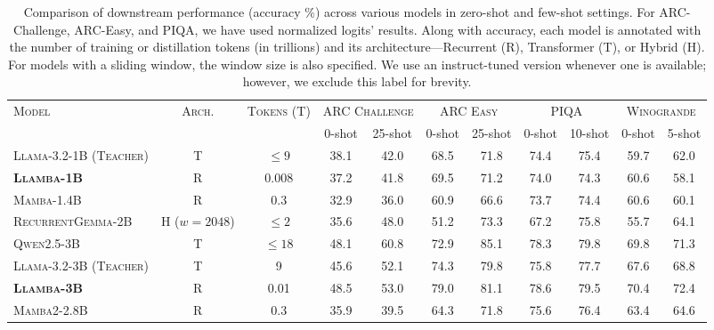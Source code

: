 \begin{table}[H]
    \small
    \centering
    \setlength{\tabcolsep}{3.2pt}
    \caption{
    Comparison of downstream performance (accuracy \%) across various models in zero-shot and few-shot settings.
    For ARC-Challenge, ARC-Easy, and PIQA, we have used normalized logits' results.
    Along with accuracy, each model is annotated with the number of training or distillation tokens (in trillions) and its architecture—Recurrent (R), Transformer (T), or Hybrid (H). For models with a sliding window, the window size is also specified.
    We use an instruct-tuned version whenever one is available; however, we exclude this label for brevity.
    }
    \label{tab:performance_comparison_1}
    \begin{tabular}{l c c c c c c c c c c}
        \toprule
        \multirow{2}{*}{\textsc{Model}} 
         & \multirow{2}{*}{\textsc{Arch.}}
         & \multirow{2}{*}{\textsc{Tokens (T)}}
         & \multicolumn{2}{c}{\textsc{ARC Challenge}} 
         & \multicolumn{2}{c}{\textsc{ARC Easy}} 
         & \multicolumn{2}{c}{\textsc{PIQA}} 
         & \multicolumn{2}{c}{\textsc{Winogrande}} \\
        \cmidrule(r){4-5} \cmidrule(r){6-7} \cmidrule(r){8-9} \cmidrule(r){10-11}
         & & & 0-shot & 25-shot & 0-shot & 25-shot & 0-shot & 10-shot & 0-shot & 5-shot \\
         
        \midrule

        \textsc{Llama-3.2-1B (Teacher)} & T & $\leq 9$   & 38.1 & 42.0 & 68.5 & 71.8 & 74.4 & 75.4 & 59.7 & 62.0 \\
        \textbf{\textsc{Llamba-1B}}      & R & 0.008      & 37.2 & 41.8 & 69.5 & 71.2 & 74.0 & 74.3 & 60.6 & 58.1 \\
        \textsc{Mamba-1.4B}             & R & 0.3        & 32.9 & 36.0 & 60.9 & 66.6 & 73.7 & 74.4 & 60.6 & 60.1 \\
        \textsc{RecurrentGemma-2B}      & H ($w=2048$) & $\leq 2$  & 35.6 & 48.0 & 51.2 & 73.3 & 67.2 & 75.8 & 55.7 & 64.1 \\
        
        \midrule

        \textsc{Qwen2.5-3B}             & T & $\leq 18$  & 48.1 & 60.8 & 72.9 & 85.1 & 78.3 & 79.8 & 69.8 & 71.3 \\
        \textsc{Llama-3.2-3B (Teacher)} & T & 9          & 45.6 & 52.1 & 74.3 & 79.8 & 75.8 & 77.7 & 67.6 & 68.8 \\
        \textbf{\textsc{Llamba-3B}}      & R & 0.01       & 48.5 & 53.0 & 79.0 & 81.1 & 78.6 & 79.5 & 70.4 & 72.4 \\
        \textsc{Mamba2-2.8B}            & R & 0.3        & 35.9 & 39.5 & 64.3 & 71.8 & 75.6 & 76.4 & 63.4 & 64.6 \\
        

\end{tabular}
\end{table}
